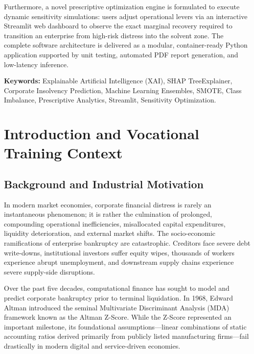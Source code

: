 \documentclass[11pt, a4paper]{article}
\begin{document}
Furthermore, a novel prescriptive optimization engine is formulated to execute dynamic sensitivity simulations: users adjust operational levers via an interactive Streamlit web dashboard to observe the exact marginal recovery required to transition an enterprise from high-risk distress into the solvent zone. The complete software architecture is delivered as a modular, container-ready Python application supported by unit testing, automated PDF report generation, and low-latency inference.

\vspace{0.8cm}
\textbf{Keywords:} Explainable Artificial Intelligence (XAI), SHAP TreeExplainer, Corporate Insolvency Prediction, Machine Learning Ensembles, SMOTE, Class Imbalance, Prescriptive Analytics, Streamlit, Sensitivity Optimization.

\clearpage

\tableofcontents
\clearpage

\section{Introduction and Vocational Training Context}

\subsection{Background and Industrial Motivation}
In modern market economies, corporate financial distress is rarely an instantaneous phenomenon; it is rather the culmination of prolonged, compounding operational inefficiencies, misallocated capital expenditures, liquidity deterioration, and external market shifts. The socio-economic ramifications of enterprise bankruptcy are catastrophic. Creditors face severe debt write-downs, institutional investors suffer equity wipes, thousands of workers experience abrupt unemployment, and downstream supply chains experience severe supply-side disruptions.

Over the past five decades, computational finance has sought to model and predict corporate bankruptcy prior to terminal liquidation. In 1968, Edward Altman introduced the seminal Multivariate Discriminant Analysis (MDA) framework known as the Altman Z-Score. While the Z-Score represented an important milestone, its foundational assumptions---linear combinations of static accounting ratios derived primarily from publicly listed manufacturing firms---fail drastically in modern digital and service-driven economies. 
\end{document}
